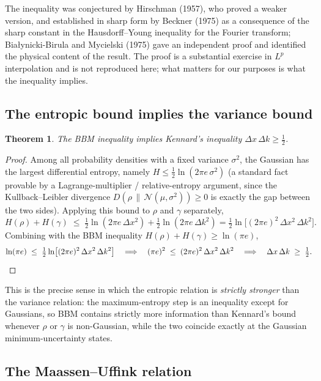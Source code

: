 \documentclass[11pt]{article}
\theoremstyle{plain}
\newtheorem{theorem}{Theorem}[section]
\theoremstyle{definition}
\theoremstyle{remark}
\begin{document}
The inequality was conjectured by Hirschman (1957), who proved a weaker version, and established
in sharp form by Beckner (1975) as a consequence of the sharp constant in the Hausdorff--Young
inequality for the Fourier transform; Bia\l ynicki-Birula and Mycielski (1975) gave an independent
proof and identified the physical content of the result. The proof is a substantial exercise in
$L^p$ interpolation and is not reproduced here; what matters for our purposes is what the
inequality implies.

\subsection{The entropic bound implies the variance bound}

\begin{theorem}
The BBM inequality implies Kennard's inequality $\Delta x\, \Delta k \geq \tfrac12$.
\end{theorem}

\begin{proof}
Among all probability densities with a fixed variance $\sigma^2$, the Gaussian has the largest
differential entropy, namely $H \le \tfrac12 \ln(2\pi e\, \sigma^2)$ (a standard fact provable by a
Lagrange-multiplier / relative-entropy argument, since the Kullback--Leibler divergence
$D(\rho \,\|\, \mathcal N(\mu,\sigma^2))\geq 0$ is exactly the gap between the two sides).
Applying this bound to $\rho$ and $\gamma$ separately,
\[
H(\rho) + H(\gamma) \;\leq\; \tfrac12\ln(2\pi e\,\Delta x^2) + \tfrac12 \ln(2\pi e\, \Delta k^2)
= \tfrac12 \ln\!\big[(2\pi e)^2\, \Delta x^2\, \Delta k^2\big] .
\]
Combining with the BBM inequality $H(\rho)+H(\gamma)\geq \ln(\pi e)$,
\[
\ln(\pi e) \;\leq\; \tfrac12\ln\!\big[(2\pi e)^2\,\Delta x^2\,\Delta k^2\big]
\quad\Longrightarrow\quad
(\pi e)^2 \;\leq\; (2\pi e)^2\, \Delta x^2\, \Delta k^2
\quad\Longrightarrow\quad
\Delta x\, \Delta k \;\geq\; \tfrac12 .
\qedhere
\]
\end{proof}

This is the precise sense in which the entropic relation is \emph{strictly stronger} than the
variance relation: the maximum-entropy step is an inequality except for Gaussians, so BBM contains
strictly more information than Kennard's bound whenever $\rho$ or $\gamma$ is non-Gaussian, while
the two coincide exactly at the Gaussian minimum-uncertainty states.

\subsection{The Maassen--Uffink relation}
\end{document}
